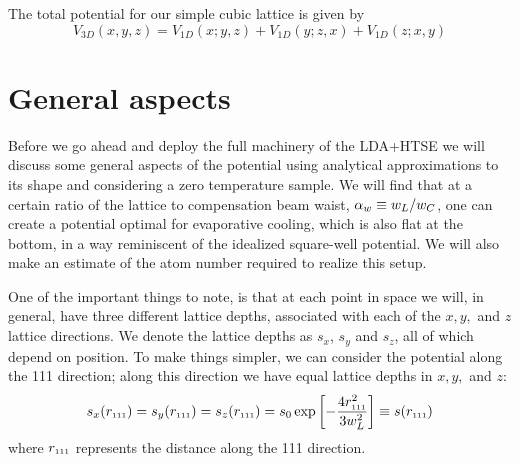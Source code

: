 The total potential for our simple cubic lattice is given by 
\begin{equation}
  V_{3D}(x, y, z)  =  V_{1D}( x; y,z) + V_{1D}( y; z,x) + V_{1D}(z; x,y)
\end{equation}


\section{General aspects}
\label{sec:general_aspects}


Before we go ahead and deploy the full machinery of the LDA+HTSE we will
discuss some general aspects of the potential using analytical approximations
to its shape and considering a zero temperature sample.  We will find that at a
certain ratio of the lattice to compensation beam waist,    $ \alpha_{w}  \equiv
w_{L}/w_{C}$,  one can create a potential optimal for evaporative cooling,
which is also flat at the bottom, in a way reminiscent of the idealized
square-well potential. We will also make an estimate of the atom number
required to realize this setup.

One of the important things to note, is that at each point in space  we will, in
general, have three different lattice depths, associated with each of the
$x,y,$ and $z$ lattice directions. We denote the lattice depths as $s_{x}$,
$s_{y}$ and $s_{z}$, all of which depend on position. To make things simpler,
we can consider the potential along the 111 direction; along this direction
we have equal lattice depths in $x,y,$ and $z$:
\begin{equation} 
  s_{x}(  r_{\text{\tiny{111}}}  ) = s_{y}(  r_{\text{\tiny{111}}}  ) = s_{z}(  r_{\text{\tiny{111}}}  ) = 
  s_{0} \exp \left[ - \frac{ 4  r_{\text{\tiny{111}}} ^{2} }{3 w_{L}^{2} } \right]  
  \equiv s( r_{\text{\tiny{111}}} ) 
\end{equation}
where $ r_{\text{\tiny{111}}} $ represents the distance along the 111 direction.

